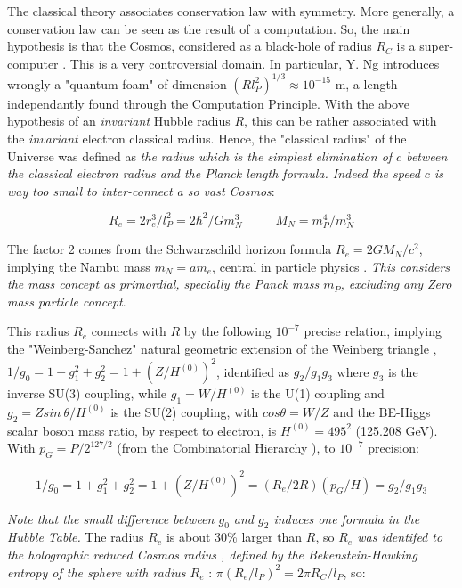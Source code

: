 \documentclass[a4paper,9pt]{article}
\begin{document}
The classical theory associates conservation law with symmetry. More generally, a conservation law can be seen as the result of a computation. So, the main hypothesis is that the Cosmos, considered as a black-hole of radius  $R_C$ is a super-computer \cite{Sanchez2}. This is a very controversial domain. In particular, Y. Ng \cite{Ng} introduces wrongly a "quantum foam" of dimension $(Rl_P^2)^{1/3} \approx 10^{-15} $ m, a length independantly found through the Computation Principle\cite{Sanchez2}. With the above hypothesis of an \textit{invariant} Hubble radius $R$, this can be rather associated with the \textit{invariant} electron classical radius. Hence, the "classical radius" of the Universe was defined as \textit{the radius which is the simplest elimination of $c$ between the classical electron radius and the Planck length formula. Indeed the speed $c$ is way too small to inter-connect a so vast Cosmos}: 

\begin{equation}\label{Eq4}
R_e = 2r_e^3/l_P^2 = 2 \hbar^2/Gm_N^3 ~~~~~~~~~~~~ M_N = m_P^4/m_N^3
 \end{equation}
 
The factor 2 comes from the Schwarzschild horizon formula $R_e  = 2GM_N /c^2$, implying the Nambu mass $m_N = am_e$, central in particle physics \cite{Nambu}. \textit{This considers the mass concept as primordial, specially the Panck mass $m_P$, excluding any Zero mass particle concept}\cite{Sanchez3}.  

This radius $R_e$ connects with $R$ by the following $10^{-7}$ precise relation, implying the "Weinberg-Sanchez" natural geometric extension of the Weinberg triangle \cite{Taylor}, $1/g_0 = 1+g_1^2 +g_2^2 = 1 + (Z/H^{(0)})^2$, identified as $g_2/g_1g_3$ where $g_3$ is the inverse SU(3) coupling, while $g_1 = W/H^{(0)}$ is the U(1) coupling and $g_2 = Z sin~\theta/H^{(0)}$ is the SU(2) coupling, with $cos\theta = W/Z$ and the BE-Higgs scalar boson mass ratio, by respect to electron, is $H^{(0)} = 495^2$ (125.208 GeV)\cite{Sanchez3}. With $p_G = P/2^{127/2}$ (from the Combinatorial Hierarchy \cite{Bastin}), to $10^{-7}$ precision: 

\begin{equation}\label{Eq5}
1/g_0 = 1+g_1^2 +g_2^2 = 1 + (Z/H^{(0)})^2 = (R_e/2R) (p_G/H) = g_2/g_1g_3 
 \end{equation}


\textit{Note that the small difference between $g_0$ and $g_2$ induces one  formula in the Hubble Table.} The radius $R_e$ is about 30\% larger than $R$, so \textit {$R_e$ was identifed to the holographic reduced Cosmos radius \cite{Sanchez3}, defined by the Bekenstein-Hawking entropy of the sphere with radius $R_e$} \cite{Bekenstein}: $\pi (R_e/l_P)^2 = 2\pi R_C/l_P$, so:   
\end{document}
